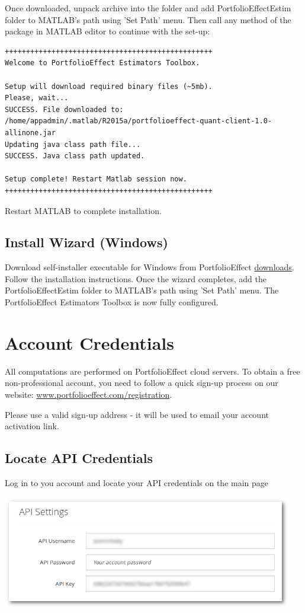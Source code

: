 \documentclass[letterpaper]{report}
\begin{document}
Once downloaded, unpack archive into the folder and add
PortfolioEffectEstim folder to MATLAB's path using 'Set Path' menu. Then call
any method of the package in MATLAB editor to continue with the set-up:
\begin{lstlisting}
+++++++++++++++++++++++++++++++++++++++++++++++++
Welcome to PortfolioEffect Estimators Toolbox.
 
Setup will download required binary files (~5mb).
Please, wait...
SUCCESS. File downloaded to: 
/home/appadmin/.matlab/R2015a/portfolioeffect-quant-client-1.0-allinone.jar
Updating java class path file...
SUCCESS. Java class path updated.

Setup complete! Restart Matlab session now.
+++++++++++++++++++++++++++++++++++++++++++++++++
\end{lstlisting}

Restart MATLAB to complete installation.

\section{Install Wizard (Windows)}
Download self-installer executable for Windows from PortfolioEffect
\href{https://www.portfolioeffect.com/docs/platform/quant/tools/matlab}{downloads}.
Follow the installation instructions. Once the wizard completes, add the
PortfolioEffectEstim folder to MATLAB's path using 'Set Path' menu. 
The PortfolioEffect Estimators Toolbox is now fully configured.

\chapter{Account Credentials}
All computations are performed on PortfolioEffect cloud servers.
To obtain a free non-professional account, you need to follow a quick sign-up
process on our website:
\href{https://www.portfolioeffect.com/registration}{www.portfolioeffect.com/registration}.\par
Please use a valid sign-up address - it will be used to email your
account activation link.

\section{Locate API Credentials} 
Log in to you account and locate your API credentials on the main page

\includegraphics[width=5in,natwidth=768,natheight=300]{img/api-settings.png}
 
\end{document}
